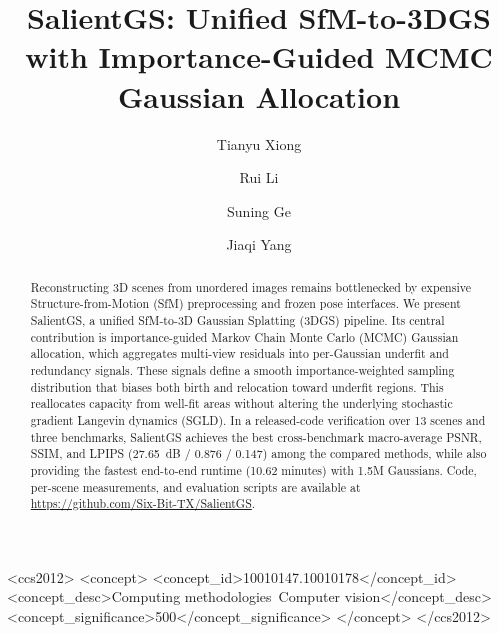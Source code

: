 \documentclass[sigconf]{acmart}
\begin{document}
\raggedbottom
\setlength{\emergencystretch}{2em}

\title{SalientGS: Unified SfM-to-3DGS with Importance-Guided MCMC Gaussian Allocation}

\author{Tianyu Xiong}
\author{Rui Li}

\author{Suning Ge}

\author{Jiaqi Yang}

\renewcommand{\shortauthors}{T. Xiong et al.}

\begin{abstract}
Reconstructing 3D scenes from unordered images remains bottlenecked by expensive Structure-from-Motion (SfM) preprocessing and frozen pose interfaces. We present SalientGS, a unified SfM-to-3D Gaussian Splatting (3DGS) pipeline. Its central contribution is importance-guided Markov Chain Monte Carlo (MCMC) Gaussian allocation, which aggregates multi-view residuals into per-Gaussian underfit and redundancy signals. These signals define a smooth importance-weighted sampling distribution that biases both birth and relocation toward underfit regions. This reallocates capacity from well-fit areas without altering the underlying stochastic gradient Langevin dynamics (SGLD). In a released-code verification over 13 scenes and three benchmarks, SalientGS achieves the best cross-benchmark macro-average PSNR, SSIM, and LPIPS (27.65~dB / 0.876 / 0.147) among the compared methods, while also providing the fastest end-to-end runtime (10.62 minutes) with 1.5M Gaussians. Code, per-scene measurements, and evaluation scripts are available at \url{https://github.com/Six-Bit-TX/SalientGS}.
\end{abstract}

\begin{CCSXML}
<ccs2012>
 <concept>
  <concept_id>10010147.10010178</concept_id>
  <concept_desc>Computing methodologies~Computer vision</concept_desc>
  <concept_significance>500</concept_significance>
 </concept>
</ccs2012>
\end{CCSXML}
\end{document}
